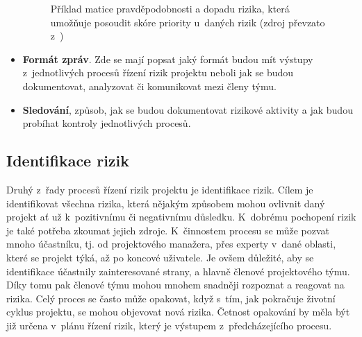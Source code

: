 \begin{itemize}
    \begin{figure}[ht]
    \begin{center}
    \caption{Příklad matice pravděpodobnosti a dopadu rizika, která umožňuje posoudit skóre priority u~daných rizik (zdroj převzato z~\cite{PMBOK})}
    \label{maticePravdepodRizik}
    \end{center}
    \end{figure}
    
    \item \textbf{Formát zpráv}. Zde se mají popsat jaký formát budou mít výstupy z~jednotlivých procesů řízení rizik projektu neboli jak se budou dokumentovat, analyzovat či komunikovat mezi členy týmu.
    \item \textbf{Sledování}, způsob, jak se budou dokumentovat rizikové aktivity a jak budou probíhat kontroly jednotlivých procesů.
\end{itemize}

\subsection{Identifikace rizik}
\label{identRizik}

Druhý z~řady procesů řízení rizik projektu je identifikace rizik. Cílem je identifikovat všechna rizika, která nějakým způsobem mohou ovlivnit daný projekt ať už k~pozitivnímu či negativnímu důsledku. K~dobrému pochopení rizik je také potřeba zkoumat jejich zdroje. K~činnostem procesu se může pozvat mnoho účastníku, tj. od projektového manažera, přes experty v~dané oblasti, které se projekt týká, až po koncové uživatele. Je ovšem důležité, aby se identifikace účastnily zainteresované strany, a hlavně členové projektového týmu. Díky tomu pak členové týmu mohou mnohem snadněji rozpoznat a reagovat na rizika. Celý proces se často může opakovat, když s~tím, jak pokračuje životní cyklus projektu, se mohou objevovat nová rizika. Četnost opakování by měla být již určena v~plánu řízení rizik, který je výstupem z~předcházejícího procesu.

